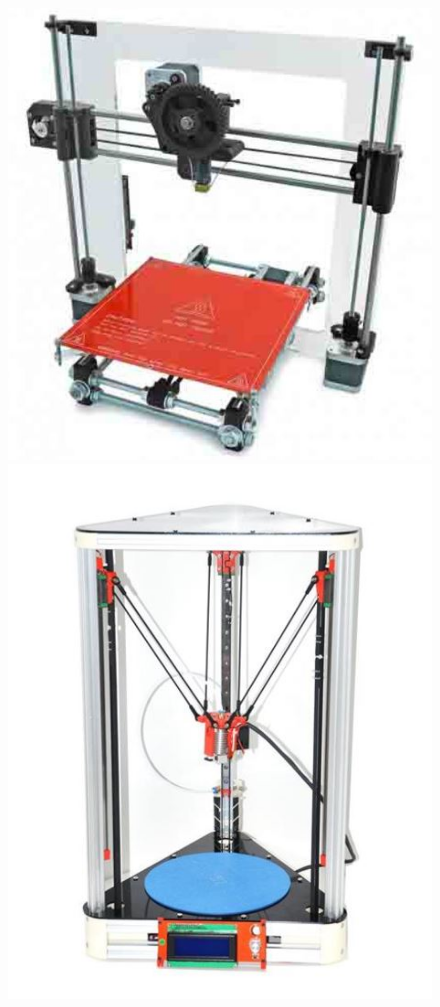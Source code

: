 \documentclass[a4paper, 11pt, reqno]{report}
\begin{document}
\begin{figure}[h]
  \centering
  \begin{minipage}[b]{0.3\textwidth}
    \includegraphics[width=\textwidth]{cartesianPrinter}
  \end{minipage}
  \hfill
  \begin{minipage}[b]{0.3\textwidth}
    \includegraphics[width=\textwidth]{deltaPrinter}

\end{minipage}
\end{figure}
\end{document}
